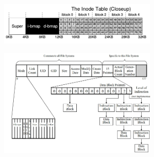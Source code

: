 \documentclass[titlepage,a4paper]{article}
\begin{document}
    \begin{figure}[!htb]
    \centering
    \includegraphics[width=0.7\textwidth]{ImagenesApunte/inodes.jpg}
    \end{figure}
    
    \begin{figure}[!htb]
    \centering
    \includegraphics[width=0.7\textwidth]{ImagenesApunte/inode.jpg}
    \end{figure}

\newpage
\end{document}
